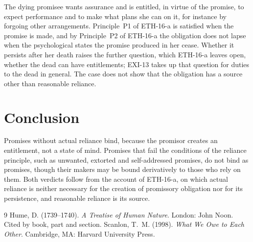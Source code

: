 \documentclass{situationist-preprint}
\begin{document}
\begin{reply}
The dying promisee wants assurance and is entitled, in virtue of the promise, to expect performance and to make what plans she can on it, for instance by forgoing other arrangements. Principle~P1 of ETH-16-a is satisfied when the promise is made, and by Principle~P2 of ETH-16-a the obligation does not lapse when the psychological states the promise produced in her cease. Whether it persists after her death raises the further question, which ETH-16-a leaves open, whether the dead can have entitlements; EXI-13 takes up that question for duties to the dead in general. The case does not show that the obligation has a source other than reasonable reliance.
\end{reply}

\section{Conclusion}

Promises without actual reliance bind, because the promisor creates an entitlement, not a state of mind. Promises that fail the conditions of the reliance principle, such as unwanted, extorted and self-addressed promises, do not bind as promises, though their makers may be bound derivatively to those who rely on them. Both verdicts follow from the account of ETH-16-a, on which actual reliance is neither necessary for the creation of promissory obligation nor for its persistence, and reasonable reliance is its source.

\begin{thebibliography}{9}\small
{} Hume, D. (1739--1740). \emph{A Treatise of Human Nature}. London: John Noon. Cited by book, part and section.
 Scanlon, T.~M. (1998). \emph{What We Owe to Each Other}. Cambridge, MA: Harvard University Press.
\end{thebibliography}
\end{document}
